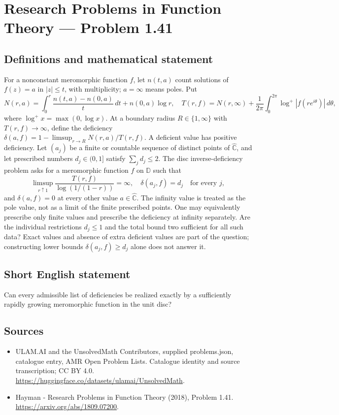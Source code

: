 \documentclass[11pt,a4paper]{article}
\begin{document}
\section*{Research Problems in Function Theory — Problem 1.41}\label{statement}

\subsection{Definitions and mathematical statement}
For a nonconstant meromorphic function $f$, let $n(t,a)$ count solutions of $f(z)=a$ in $|z|\le t$, with multiplicity; $a=\infty$ means poles. Put
\[
N(r,a)=\int_0^r\frac{n(t,a)-n(0,a)}t\,dt+n(0,a)\log r,
\quad T(r,f)=N(r,\infty)+\frac1{2\pi}\int_0^{2\pi}\log^+|f(re^{i\theta})|\,d\theta,
\]
where $\log^+x=\max(0,\log x)$. At a boundary radius $R\in\{1,\infty\}$ with $T(r,f)\to\infty$, define the deficiency
$\delta(a,f)=1-\limsup_{r\to R}N(r,a)/T(r,f)$. A deficient value has positive deficiency.
Let $(a_j)$ be a finite or countable sequence of distinct points of $\widehat{\mathbb C}$, and let prescribed numbers $d_j\in(0,1]$ satisfy
$\sum_jd_j\le2$. The disc inverse-deficiency problem asks for a meromorphic function $f$ on $\mathbb D$ such that
\[
\limsup_{r\uparrow1}\frac{T(r,f)}{\log(1/(1-r))}=\infty,
\quad \delta(a_j,f)=d_j\quad\text{for every }j,
\]
and $\delta(a,f)=0$ at every other value $a\in\widehat{\mathbb C}$. The infinity value is treated as the pole value, not as a limit of the finite prescribed points. One may equivalently prescribe only finite values and prescribe the deficiency at infinity separately.
Are the individual restrictions $d_j\le1$ and the total bound two sufficient for all such data? Exact values and absence of extra deficient values are part of the question; constructing lower bounds $\delta(a_j,f)\ge d_j$ alone does not answer it.
\subsection{Short English statement}
Can every admissible list of deficiencies be realized exactly by a sufficiently rapidly growing meromorphic function in the unit disc?
\subsection{Sources}
\begin{itemize}
\item[S1] ULAM.AI and the UnsolvedMath Contributors, supplied problems.json, catalogue entry, AMR Open Problem Lists. Catalogue identity and source transcription; CC BY 4.0.
\url{https://huggingface.co/datasets/ulamai/UnsolvedMath}.
\item[S2] Hayman - Research Problems in Function Theory (2018), Problem 1.41. 
\url{https://arxiv.org/abs/1809.07200}.
\end{itemize}
\end{document}

